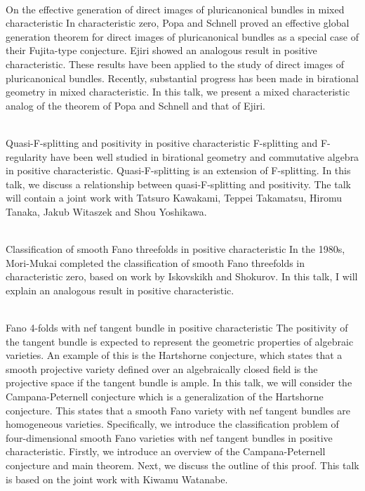 \documentclass[dvipdfmx,a4paper,12pt]{article}
\theoremstyle{plain} %
\theoremstyle{definition} %
\begin{document}
\vskip4mm
\vskip3mm

\\
On the effective generation of direct images of pluricanonical bundles in mixed characteristic
\vskip3mm
In characteristic zero, Popa and Schnell proved an effective global generation theorem for direct images of pluricanonical bundles as a special case of their Fujita-type conjecture. Ejiri showed an analogous result in positive characteristic. These results have been applied to the study of direct images of pluricanonical bundles. Recently, substantial progress has been made in birational geometry in mixed characteristic. In this talk, we present a mixed characteristic analog of the theorem of Popa and Schnell and that of Ejiri.
\vskip4mm

\\
Quasi-F-splitting and positivity in positive characteristic
\vskip3mm
F-splitting and F-regularity have been well studied in birational geometry and commutative algebra in positive characteristic. Quasi-F-splitting is an extension of F-splitting.
In this talk, we discuss a relationship between quasi-F-splitting and positivity. The talk will contain a joint work with Tatsuro Kawakami, Teppei Takamatsu, Hiromu Tanaka, Jakub Witaszek and Shou Yoshikawa.
\vskip4mm

\\
Classification of smooth Fano threefolds in positive characteristic
\vskip3mm
In the 1980s, Mori-Mukai completed the classification of smooth Fano threefolds in characteristic zero, based on work by Iskovskikh and Shokurov. In this talk, I will explain an analogous result in positive characteristic.

\newpage

\\
Fano 4-folds with nef tangent bundle in positive characteristic
\vskip3mm
The positivity of the tangent bundle is expected to represent the geometric properties of algebraic varieties. An example of this is the Hartshorne conjecture, which states that a smooth projective variety  defined over an algebraically closed field is the projective space if the tangent bundle is ample. In this talk, we will consider the Campana-Peternell conjecture which is a generalization of the Hartshorne conjecture. This states that a smooth Fano variety with nef tangent bundles are homogeneous varieties. Specifically, we introduce the classification problem of four-dimensional smooth Fano varieties with nef tangent bundles in positive characteristic. Firstly, we introduce an overview of the Campana-Peternell conjecture and main theorem. Next, we discuss the outline of this proof. This talk is based on the joint work with Kiwamu Watanabe.
\vskip6mm
\end{document}
